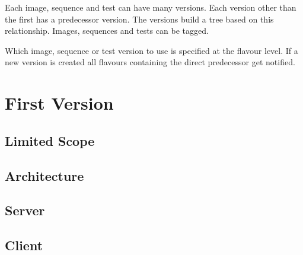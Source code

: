 \documentclass[a4paper,twocolumn]{article}
\begin{document}
Each image, sequence and test can have many versions.
Each version other than the first has a predecessor version.
The versions build a tree based on this relationship.
Images, sequences and tests can be tagged.

Which image, sequence or test version to use is specified at the flavour level.
If a new version is created all flavours containing the direct predecessor get notified.

\section{First Version}

\subsection{Limited Scope}

\subsection{Architecture}

\subsection{Server}

\subsection{Client}


\printbibliography[notkeyword=software]
\printbibliography[keyword=used,title={Used software}]
\printbibliography[notkeyword=used,keyword=software,title={Other software}]
\end{document}
